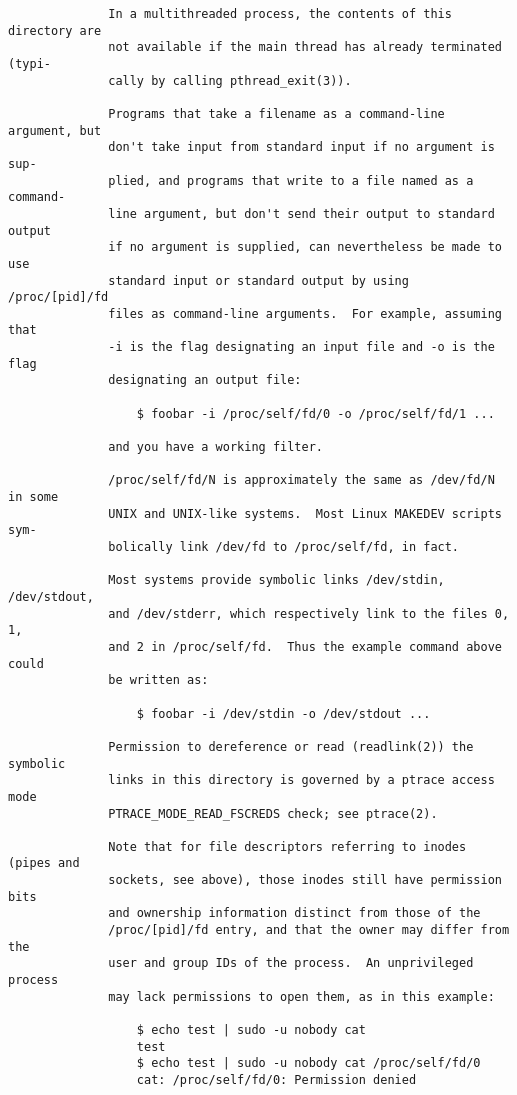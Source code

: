 \documentclass[]{article}
\begin{document}
\begin{verbatim}
              In a multithreaded process, the contents of this directory are
              not available if the main thread has already terminated (typi‐
              cally by calling pthread_exit(3)).

              Programs that take a filename as a command-line argument, but
              don't take input from standard input if no argument is sup‐
              plied, and programs that write to a file named as a command-
              line argument, but don't send their output to standard output
              if no argument is supplied, can nevertheless be made to use
              standard input or standard output by using /proc/[pid]/fd
              files as command-line arguments.  For example, assuming that
              -i is the flag designating an input file and -o is the flag
              designating an output file:

                  $ foobar -i /proc/self/fd/0 -o /proc/self/fd/1 ...

              and you have a working filter.

              /proc/self/fd/N is approximately the same as /dev/fd/N in some
              UNIX and UNIX-like systems.  Most Linux MAKEDEV scripts sym‐
              bolically link /dev/fd to /proc/self/fd, in fact.

              Most systems provide symbolic links /dev/stdin, /dev/stdout,
              and /dev/stderr, which respectively link to the files 0, 1,
              and 2 in /proc/self/fd.  Thus the example command above could
              be written as:

                  $ foobar -i /dev/stdin -o /dev/stdout ...

              Permission to dereference or read (readlink(2)) the symbolic
              links in this directory is governed by a ptrace access mode
              PTRACE_MODE_READ_FSCREDS check; see ptrace(2).

              Note that for file descriptors referring to inodes (pipes and
              sockets, see above), those inodes still have permission bits
              and ownership information distinct from those of the
              /proc/[pid]/fd entry, and that the owner may differ from the
              user and group IDs of the process.  An unprivileged process
              may lack permissions to open them, as in this example:

                  $ echo test | sudo -u nobody cat
                  test
                  $ echo test | sudo -u nobody cat /proc/self/fd/0
                  cat: /proc/self/fd/0: Permission denied


\end{verbatim}
\end{document}
